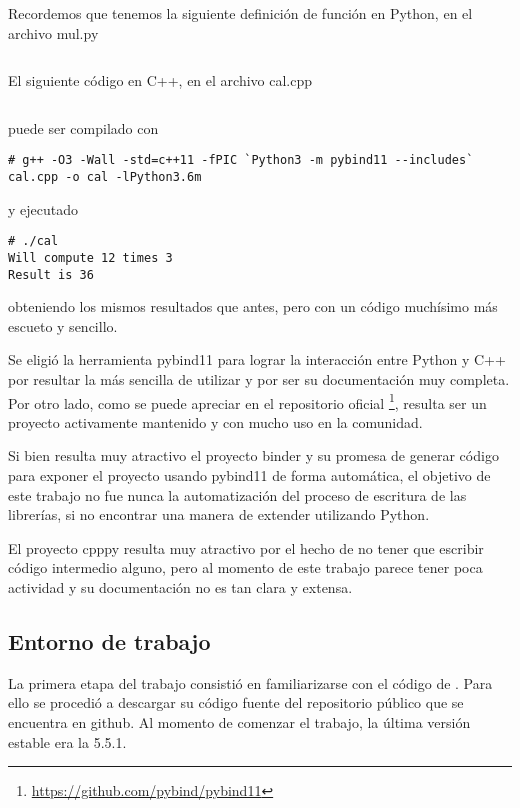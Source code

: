 Recordemos que tenemos la siguiente definición de función en Python, en el
archivo mul.py

\inputminted{Python}{codelistings/multiply.py}

El siguiente código en C++, en el archivo cal.cpp

\inputminted{c}{codelistings/use_multiply_pybind.c}

puede ser compilado con

\begin{verbatim}
# g++ -O3 -Wall -std=c++11 -fPIC `Python3 -m pybind11 --includes` cal.cpp -o cal -lPython3.6m
\end{verbatim}

y ejecutado

\begin{verbatim}
# ./cal
Will compute 12 times 3
Result is 36
\end{verbatim}

obteniendo los mismos resultados que antes, pero con un código muchísimo más
escueto y sencillo.

Se eligió la herramienta pybind11 para lograr la interacción entre Python y C++
por resultar la más sencilla de utilizar y por ser su documentación muy
completa. Por otro lado, como se puede apreciar en el repositorio oficial
\footnote{\url{https://github.com/pybind/pybind11}}, resulta ser un proyecto
activamente mantenido y con mucho uso en la comunidad.

Si bien resulta muy atractivo el proyecto binder y su promesa de generar
código para exponer el proyecto usando pybind11 de forma automática, el
objetivo de este trabajo no fue nunca la automatización del proceso de
escritura de las librerías, si no encontrar una manera de extender \omnetpp{}
utilizando Python.

El proyecto cpppy resulta muy atractivo por el hecho de no tener que escribir
código intermedio alguno, pero al momento de este trabajo parece tener poca
actividad y su documentación no es tan clara y extensa.

\subsection{Entorno de trabajo}

La primera etapa del trabajo consistió en familiarizarse con el código de
\omnetpp{}. Para ello se procedió a descargar su código fuente del repositorio
público que se encuentra en github. Al momento de comenzar el trabajo, la
última versión estable era la 5.5.1.

